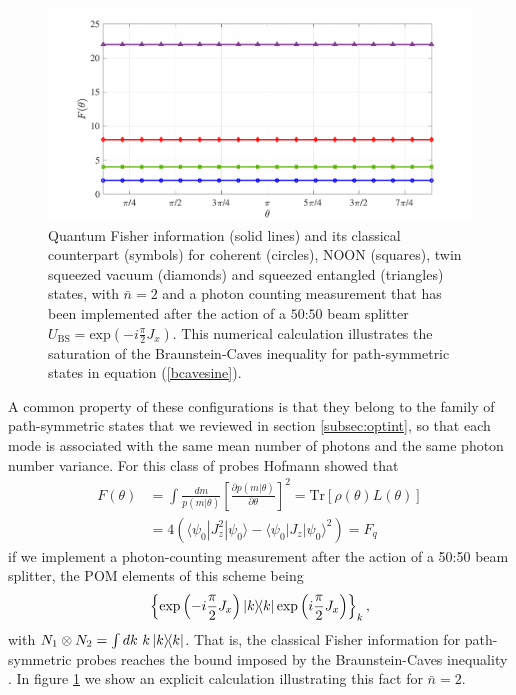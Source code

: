\begin{figure}[t]
\centering
\includegraphics[trim={1.6cm 0.1cm 1.5cm 0.5cm},clip,width=15.5cm]{pictures/ch4_fig1}
	\caption[Saturation of the Braunstein-Caves inequality for optical schemes]{Quantum Fisher information (solid lines) and its classical counterpart (symbols) for coherent (circles), NOON (squares), twin squeezed vacuum (diamonds) and squeezed entangled (triangles) states, with $\bar{n} = 2$ and a photon counting measurement that has been implemented after the action of a $50$:$50$ beam splitter $U_{\mathrm{BS}} = \mathrm{exp}(-i\frac{\pi}{2}J_x)$. This numerical calculation illustrates the saturation of the Braunstein-Caves inequality for path-symmetric states in equation (\ref{bcavesine}).}
\label{braunsteincaves}
\end{figure}

A common property of these configurations is that they belong to the family of path-symmetric states that we reviewed in section \ref{subsec:optint}, so that each mode is associated with the same mean number of photons and the same photon number variance. For this class of probes Hofmann showed that \cite{HofmannHolger2009}
\begin{align}
F(\theta) &= \int \frac{dm}{p(m|\theta)}\left[\frac{\partial p(m|\theta)}{\partial \theta}\right]^2 = \mathrm{Tr}\left[\rho(\theta) L(\theta) \right]
\nonumber \\
&= 4 \left(\langle \psi_0 |J_z^2| \psi_0\rangle - \langle \psi_0 |J_z| \psi_0\rangle^2 \right) = F_q
\label{bcavesine}
\end{align}
if we implement a photon-counting measurement after the action of a 50:50 beam splitter, the POM elements of this scheme being
\begin{equation}
\left\lbrace \mathrm{exp}\left(-i\frac{\pi}{2}J_x \right) \ketbra{k}\mathrm{exp}\left(i\frac{\pi}{2}J_x\right) \right\rbrace_k,
\label{photonpom}
\end{equation}
with $N_1\otimes N_2 = \int dk~k\ketbra{k}$. That is, the classical Fisher information for path-symmetric probes reaches the bound imposed by the Braunstein-Caves inequality \cite{BraunsteinCaves1994}. In figure \ref{braunsteincaves} we show an explicit calculation illustrating this fact for $\bar{n} = 2$. 

